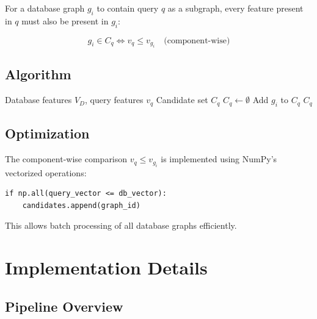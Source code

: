 \documentclass[12pt,a4paper]{article}
\begin{document}
For a database graph $g_i$ to contain query $q$ as a subgraph, every feature present in $q$ must also be present in $g_i$:

\[
g_i \in C_q \iff v_q \leq v_{g_i} \quad \text{(component-wise)}
\]

\subsection{Algorithm}

\begin{algorithm}[H]
\caption{Candidate Set Generation}
\begin{algorithmic}[1]
\Require Database features $V_D$, query features $v_q$
\Ensure Candidate set $C_q$
\State $C_q \gets \emptyset$
        \State Add $g_i$ to $C_q$
    \EndIf
\EndFor
\State \Return $C_q$
\end{algorithmic}
\end{algorithm}

\subsection{Optimization}

The component-wise comparison $v_q \leq v_{g_i}$ is implemented using NumPy's vectorized operations:

\begin{verbatim}
if np.all(query_vector <= db_vector):
    candidates.append(graph_id)
\end{verbatim}

This allows batch processing of all database graphs efficiently.

\section{Implementation Details}

\subsection{Pipeline Overview}
\end{document}
